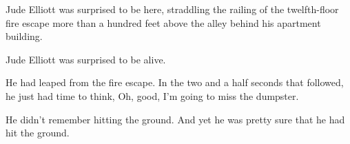 \null\vfill

\noindent
Jude Elliott was surprised to be here, straddling the railing of the twelfth-floor fire escape more than a hundred feet above the alley behind his apartment building.

Jude Elliott was surprised to be alive.

He had leaped from the fire escape. In the two and a half seconds that followed, he just had time to think, Oh, good, I'm going to miss the dumpster.

He didn't remember hitting the ground. And yet he was pretty sure that he had hit the ground.

\vfill

